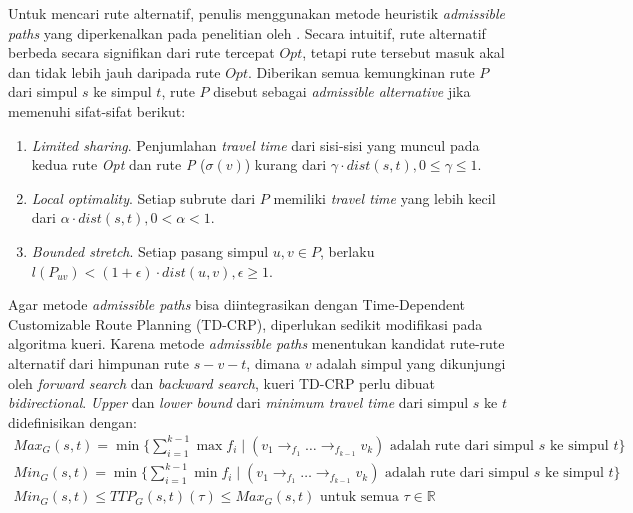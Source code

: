 Untuk mencari rute alternatif, penulis menggunakan metode heuristik \textit{admissible paths} yang diperkenalkan pada penelitian oleh \cite{Abraham2010}. Secara intuitif, rute alternatif berbeda secara signifikan dari rute tercepat $Opt$, tetapi rute tersebut masuk akal dan tidak lebih jauh daripada rute $Opt$. Diberikan semua kemungkinan rute $P$ dari simpul $s$ ke simpul $t$, rute $P$ disebut sebagai \textit{admissible alternative} jika memenuhi sifat-sifat berikut:
\begin{enumerate}
    \item \textit{Limited sharing}. Penjumlahan \textit{travel time} dari sisi-sisi yang muncul pada kedua rute \textit{Opt} dan rute \textit{P} ($\sigma(v)$) kurang dari $\gamma \cdot dist(s,t), 0 \leq \gamma \leq 1$.
    \item \textit{Local optimality}. Setiap subrute dari $P$ memiliki \textit{travel time} yang lebih kecil dari $\alpha \cdot dist(s,t), 0<\alpha<1$.
    \item \textit{Bounded stretch}. Setiap pasang simpul $u,v\in P$, berlaku $l(P_{uv})< (1+\epsilon)\cdot dist(u,v), \epsilon \geq 1$. 
\end{enumerate}

Agar metode \textit{admissible paths} bisa diintegrasikan dengan Time-Dependent Customizable Route Planning (TD-CRP), diperlukan sedikit modifikasi pada algoritma kueri. Karena metode \textit{admissible paths} menentukan kandidat rute-rute alternatif dari himpunan rute $s-v-t$, dimana $v$ adalah simpul yang dikunjungi oleh \textit{forward search} dan \textit{backward search}, kueri TD-CRP perlu dibuat \textit{bidirectional}. \textit{Upper} dan \textit{lower bound} dari \textit{minimum travel time } dari simpul $s$ ke $t$ didefinisikan dengan:
\begin{align}
    Max_{G}(s,t)=\min \{ \sum_{i=1}^{k-1} \max f_i \mid (v_1 \rightarrow_{f_1} \ldots \rightarrow_{f_{k-1}} v_k ) \text{ adalah rute dari simpul } s \text{ ke simpul } t \} \\ 
    Min_{G}(s,t)=\min \{ \sum_{i=1}^{k-1} \min f_i \mid (v_1 \rightarrow_{f_1} \ldots \rightarrow_{f_{k-1}} v_k ) \text{ adalah rute dari simpul } s \text{ ke simpul } t \} \\
    Min_{G}(s,t)\leq TTP_G(s,t)(\tau)\leq Max_G(s,t) \text{ untuk semua } \tau\in \mathbb{R}
\end{align}



